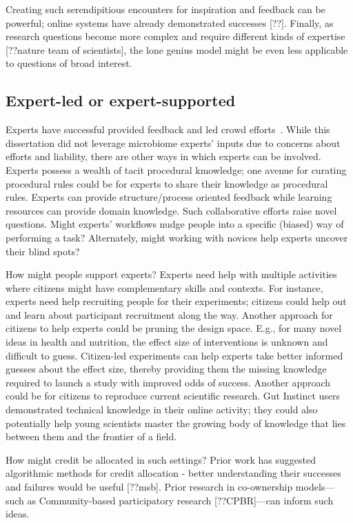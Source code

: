 Creating such serendipitious encounters for inspiration and feedback can be powerful; online systems have already demonstrated successes [??]. Finally, as research questions become more complex and require different kinds of expertise [??nature team of scientists], the lone genius model might be even less applicable to questions of broad interest. 

\subsection{Expert-led or expert-supported}
Experts have successful provided feedback and led crowd efforts~\cite{dow2012shepherding}. While this dissertation did not leverage microbiome experts' inputs due to concerns about efforts and liability, there are other ways in which experts can be involved. Experts possess a wealth of tacit procedural kmowledge; one avenue for curating procedural rules could be for experts to share their knowledge as procedural rules.  Experts can provide structure/process oriented feedback while learning resources can provide domain knowledge. Such collaborative efforts raise novel questions. Might experts' workflows nudge people into a specific (biased) way of performing a task? Alternately, might working with novices help experts uncover their blind spots?

How might people support experts? Experts need help with multiple activities where citizens might have complementary skills and contexts. For instance, experts need help recruiting people for their experiments; citizens could help out and learn about participant recruitment along the way.  Another approach for citizens to help experts could be pruning the design space. E.g., for many novel ideas in health and nutrition, the effect size of interventions is unknown and difficult to guess. Citizen-led experiments can help experts take better informed guesses about the effect size, thereby providing them the missing knowledge required to launch a study with improved odds of success. Another approach could be for citizens to reproduce current scientific research. Gut Instinct users demonstrated technical knowledge in their online activity; they could also potentially help young scientists master the growing body of knowledge that lies between them and the frontier of a field.

How might credit be allocated in such settings? Prior work has suggested algorithmic methods for credit allocation - better understanding their successes and failures would be useful [??msb]. Prior research in co-ownership models---such as Community-based participatory research [??CPBR]---can inform such ideas.


